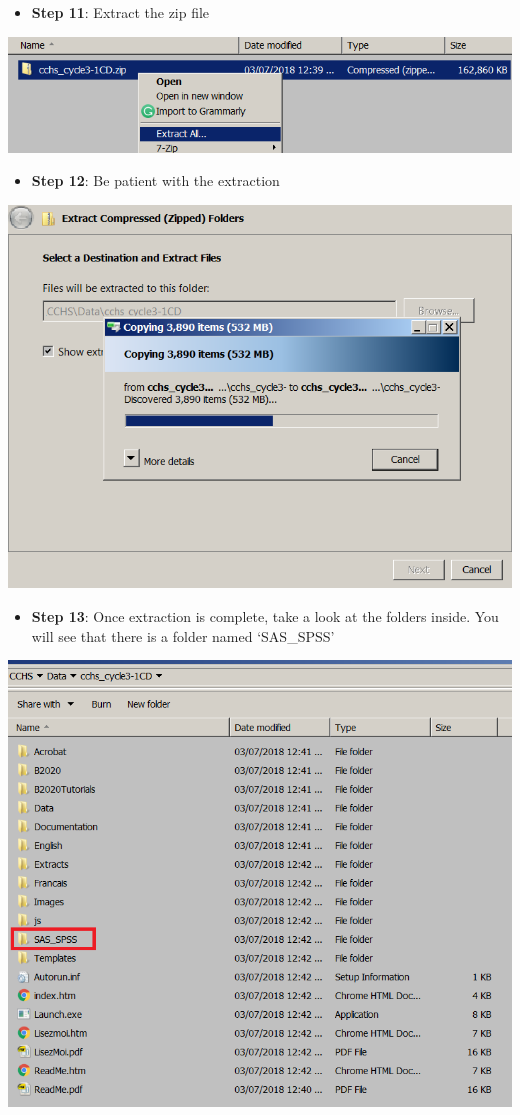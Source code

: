\documentclass[
]{book}
\providecommand{\tightlist}{%
  \setlength{\itemsep}{0pt}\setlength{\parskip}{0pt}}
\begin{document}
\begin{itemize}
\tightlist
\item
  \textbf{Step 11}: Extract the zip file
\end{itemize}

\includegraphics[width=0.65\linewidth]{images/abacus11}

\begin{itemize}
\tightlist
\item
  \textbf{Step 12}: Be patient with the extraction
\end{itemize}

\includegraphics[width=0.65\linewidth]{images/abacus12}

\begin{itemize}
\tightlist
\item
  \textbf{Step 13}: Once extraction is complete, take a look at the folders inside. You will see that there is a folder named `SAS\_SPSS'
\end{itemize}

\includegraphics[width=0.65\linewidth]{images/abacus13}
\end{document}
